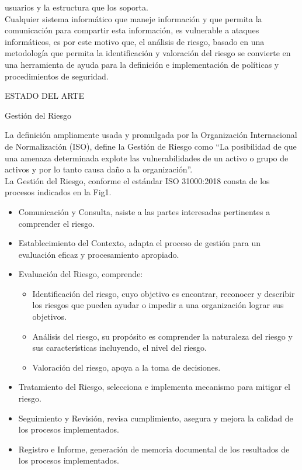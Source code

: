 \documentclass[a4paper,11pt]{article}
\begin{document}
usuarios y la estructura que los soporta.\\
Cualquier sistema informático que maneje información y que permita la comunicación 
para compartir esta información, es vulnerable a ataques informáticos, es por 
este motivo que, el análisis de riesgo, basado en una metodología que permita la identificación y valoración del riesgo se convierte en una herramienta 
de ayuda para la definición e implementación de políticas y procedimientos de 
seguridad.\\
\begin{bf}
\begin{center}
ESTADO DEL ARTE\\
\end{center}
\end{bf}
\begin{bf}   
Gestión del Riesgo\\
\end{bf}
La definición ampliamente usada y promulgada por la Organización Internacional de 
Normalización (ISO), define la Gestión de Riesgo como “La posibilidad de que una 
amenaza determinada explote las vulnerabilidades de un activo o grupo de activos y 
por lo tanto causa daño a la organización”.\\
La Gestión del Riesgo, conforme el estándar ISO 31000:2018 consta de los procesos indicados en la 
Fig1.
\begin{itemize} 
\item Comunicación y Consulta, asiste a las partes interesadas pertinentes a comprender el 
riesgo. 
\item Establecimiento del Contexto, adapta el proceso de gestión para un evaluación 
eficaz y procesamiento apropiado. 
\item Evaluación del Riesgo, comprende:
\begin{itemize}
\item Identificación del riesgo, cuyo objetivo es encontrar, reconocer y describir los 
riesgos que pueden ayudar o impedir a una organización lograr sus objetivos. 
\item Análisis del riesgo, su propósito es comprender la naturaleza del riesgo y sus 
características incluyendo, el nivel del riesgo. 
\item Valoración del riesgo, apoya a la toma de decisiones.
\end{itemize} 
\item Tratamiento del Riesgo, selecciona e implementa mecanismo para mitigar el riesgo. 
\item Seguimiento y Revisión, revisa cumplimiento, asegura y mejora la calidad de los 
procesos implementados. 
\item Registro e Informe, generación de memoria documental de los resultados de los 
procesos implementados.\\
\end{itemize}
\end{document}
